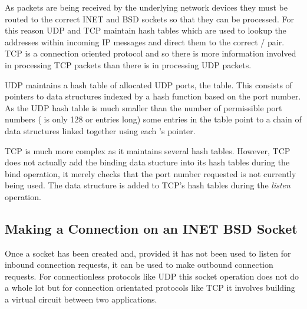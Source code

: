 As packets are being received by the underlying network devices they must be routed to the correct
INET and BSD sockets so that they can be processed.
For this reason UDP and TCP maintain hash tables which are used to lookup the addresses 
within incoming IP messages and direct them to the correct / pair.
TCP is a connection oriented protocol and so there is more information involved in processing
TCP packets than there is in processing UDP packets.

UDP maintains a hash table of allocated UDP ports, the 
table.
This consists of pointers to  data structures indexed by a hash function based
on the port number.
As the UDP hash table is much smaller than the number of permissible port numbers 
( is only 128 or  entries long)
some entries in the table point to a chain of  data structures linked together using
each 's  pointer.

TCP is much more complex as it maintains several hash tables.
However, TCP does not actually add the binding  data stucture into its hash tables
during the bind operation, it merely checks that the port number requested is not currently
being used.
The  data structure is added to TCP's hash tables during the {\em listen} operation.


\subsection{Making a Connection on an INET BSD Socket}
Once a socket has been created and, provided it has not been used to listen for inbound connection
requests, it can be used to make outbound connection requests.
For connectionless protocols like UDP this socket operation does not do a whole lot but for connection
orientated protocols like TCP it involves building a virtual circuit between two applications.

